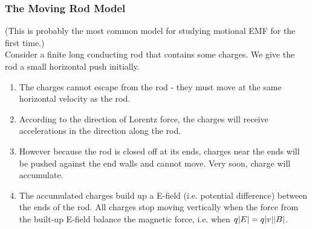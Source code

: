 \documentclass[class=article, crop=false, 12pt]{standalone}
\begin{document}
\subsubsection{The Moving Rod Model}

\iffalse
Suppose there are some charges in an infinitely long conducting rod.
When the charge is given some initial velocity perpendicular to the rod
(e.g. we give the rod a push),
the charge will start to move in a circlar trajectory, 
and the rod will be dragged along by the charge. \\

(If the rod is restricted to move horizonally, it becomes SHM.)

\insertFig{pipe SHM, make the rod infinitely long!}

\fi

{\scriptsize (This is probably the most common model for studying motional EMF for the first time.)}\\

Consider a finite long conducting rod that contains some charges. 
We give the rod a small horizontal push initially.
\begin{enumerate}
    \item The charges cannot escape from the rod - 
    they must move at the same horizontal velocity as the rod.

    \item According to the direction of Lorentz force, 
    the charges will receive accelerations in the direction along the rod.

    \item However because the rod is closed off at its ends, 
    charges near the ends will be pushed against the end walls and cannot move.
    Very soon, charge will accumulate.

    \item The accumulated charges build up a E-field (i.e. potential difference) between the ends of the rod. 
    All charges stop moving vertically when the force from the built-up E-field balance the magnetic force, 
    i.e. when $q|E| = q|v||B|$.
\end{enumerate}
\end{document}
